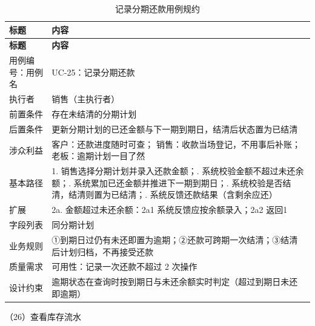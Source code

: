 {\small
\begin{longtable}{@{}L{3.0cm} L{12.3cm}@{}}
\caption{记录分期还款用例规约}\label{tab:uc-25}\\
\toprule
\textbf{标题} & \textbf{内容} \\
\midrule
\endfirsthead
\toprule
\textbf{标题} & \textbf{内容} \\
\midrule
\endhead
用例编号：用例名 & UC-25：记录分期还款 \\
\midrule
执行者 & 销售（主执行者） \\
\midrule
前置条件 & 存在未结清的分期计划 \\
\midrule
后置条件 & 更新分期计划的已还金额与下一期到期日，结清后状态置为已结清 \\
\midrule
涉众利益 & 客户：还款进度随时可查；\newline
销售：收款当场登记，不用事后补账；\newline
老板：逾期计划一目了然 \\
\midrule
基本路径 & 1. 销售选择分期计划并录入还款金额；. 系统校验金额不超过未还余额；. 系统累加已还金额并推进下一期到期日；. 系统校验是否结清，结清则置为已结清；. 系统反馈还款结果（含剩余应还） \\
\midrule
扩展 & 2a. 金额超过未还余额：2a1 系统反馈应按余额录入；2a2 返回1 \\
\midrule
字段列表 & 同分期计划 \\
\midrule
业务规则 & ①到期日过仍有未还即置为逾期；\newline ②还款可跨期一次结清；\newline ③结清后计划归档，不再接受还款 \\
\midrule
质量需求 & 可用性：记录一次还款不超过 2 次操作 \\
\midrule
设计约束 & 逾期状态在查询时按到期日与未还余额实时判定（超过到期日未还即逾期） \\
\midrule
\bottomrule
\end{longtable}}

\noindent（26）查看库存流水

